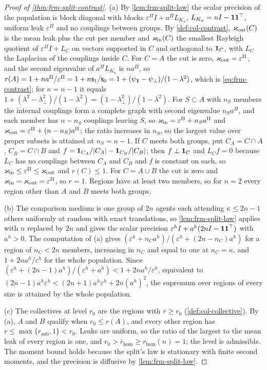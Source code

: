 \begin{proof}[Proof of \cref{thm:frm-split-contrast}]
(a) By \cref{lem:frm-split-law} the scalar precision of the population is block diagonal with blocks $\varepsilon^\Pi I+a^\Pi L_{K_n}$, $L_{K_n}=nI-\mathbf{1}\mathbf{1}^\top$, uniform leak $\varepsilon^\Pi$ and no couplings between groups. By \cref{def:col-contrast}, $\varkappa_{\mathrm{out}}(C)$ is the mean leak plus the cut per member and $\varkappa_{\mathrm{in}}(C)$ the smallest Rayleigh quotient of $\varepsilon^\Pi I+L_C$ on vectors supported in $C$ and orthogonal to $\mathbf{1}_C$, with $L_C$ the Laplacian of the couplings inside $C$. For $C=A$ the cut is zero, $\varkappa_{\mathrm{out}}=\varepsilon^\Pi$, and the second eigenvalue of $a^\Pi L_{K_n}$ is $na^\Pi$, so $r(A)=1+na^\Pi/\varepsilon^\Pi=1+n\mathsf s_1/\mathsf s_0=1+(\psi_{\mathbf{1}}-\psi_\perp)/(1-\lambda^2)$, which is \eqref{eq:frm-contrast}; for $\kappa=n-1$ it equals $1+(\lambda^2-\lambda_\perp^2)/(1-\lambda^2)=(1-\lambda_\perp^2)/(1-\lambda^2)$. For $S\subset A$ with $n_S$ members the internal couplings form a complete graph with second eigenvalue $n_Sa^\Pi$, and each member has $n-n_S$ couplings leaving $S$, so $\varkappa_{\mathrm{in}}=\varepsilon^\Pi+n_Sa^\Pi$ and $\varkappa_{\mathrm{out}}=\varepsilon^\Pi+(n-n_S)a^\Pi$; the ratio increases in $n_S$, so the largest value over proper subsets is attained at $n_S=n-1$. If $C$ meets both groups, put $C_A=C\cap A$, $C_B=C\cap B$ and $f=\mathbf{1}_{C_A}/\vert C_A\vert-\mathbf{1}_{C_B}/\vert C_B\vert$; then $f\perp\mathbf{1}_C$ and $L_Cf=0$ because $L_C$ has no couplings between $C_A$ and $C_B$ and $f$ is constant on each, so $\varkappa_{\mathrm{in}}\le\varepsilon^\Pi\le\varkappa_{\mathrm{out}}$ and $r(C)\le1$. For $C=A\cup B$ the cut is zero and $\varkappa_{\mathrm{in}}=\varkappa_{\mathrm{out}}=\varepsilon^\Pi$, so $r=1$. Regions have at least two members, so for $n=2$ every region other than $A$ and $B$ meets both groups.

(b) The comparison medium is one group of $2n$ agents each attending $\kappa\le2n-1$ others uniformly at random with exact translations, so \cref{lem:frm-split-law} applies with $n$ replaced by $2n$ and gives the scalar precision $\varepsilon^hI+a^h(2nI-\mathbf{1}\mathbf{1}^\top)$ with $a^h>0$. The computation of (a) gives $(\varepsilon^h+n_Ca^h)/(\varepsilon^h+(2n-n_C)a^h)$ for a region of $n_C<2n$ members, increasing in $n_C$ and equal to one at $n_C=n$, and $1+2na^h/\varepsilon^h$ for the whole population. Since $(\varepsilon^h+(2n-1)a^h)/(\varepsilon^h+a^h)<1+2na^h/\varepsilon^h$, equivalent to $(2n-1)a^h\varepsilon^h<(2n+1)a^h\varepsilon^h+2n(a^h)^2$, the supremum over regions of every size is attained by the whole population.

(c) The collectives at level $r_0$ are the regions with $r\ge r_0$ (\cref{def:col-collective}). By (a), $A$ and $B$ qualify when $r_0\le r(A)$, and every other region has $r\le\max\{r_{\mathrm{sub}},1\}<r_0$. Leaks are uniform, so the ratio of the largest to the mean leak of every region is one, and $r_0>\bar r_{\mathrm{hom}}\ge r_{\mathrm{hom}}(n)=1$; the level is admissible. The moment bound holds because the split's law is stationary with finite second moments, and the precision is diffusive by \cref{lem:frm-split-law}.


\end{proof}
